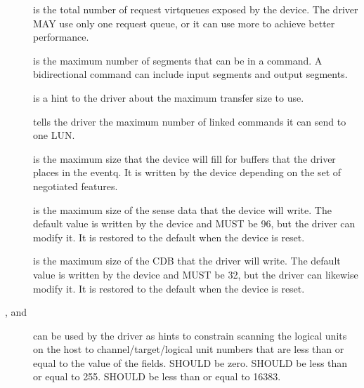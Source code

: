 \begin{description}
\item[] is the total number of request virtqueues exposed by
    the device. The driver MAY use only one request queue,
    or it can use more to achieve better performance.

\item[] is the maximum number of segments that can be in a
    command. A bidirectional command can include  input
    segments and  output segments.

\item[] is a hint to the driver about the maximum transfer
    size to use.

\item[] tells the driver the maximum number of
    linked commands it can send to one LUN.

\item[] is the maximum size that the device will fill
    for buffers that the driver places in the eventq. It is
    written by the device depending on the set of negotiated
    features.

\item[] is the maximum size of the sense data that the
    device will write. The default value is written by the device
    and MUST be 96, but the driver can modify it. It is
    restored to the default when the device is reset.

\item[] is the maximum size of the CDB that the driver will
    write. The default value is written by the device and MUST
    be 32, but the driver can likewise modify it. It is
    restored to the default when the device is reset.

\item[,  and ] can be
    used by the driver as hints to constrain scanning the logical units
    on the host to channel/target/logical unit numbers that are less than
    or equal to the value of the fields.   SHOULD
    be zero.   SHOULD be less than or equal to 255.
     SHOULD be less than or equal to 16383.
\end{description}


